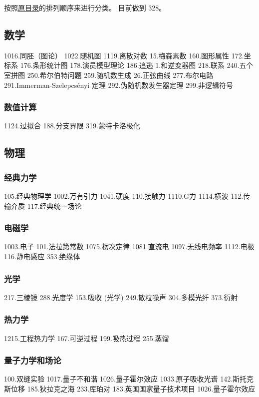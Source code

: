 
\begin{issues}
\issueDraft
\end{issues}

按照\href{https://wuli.wiki/assets/sogou}{原目录}的排列顺序来进行分类。 目前做到 328。

\subsection{数学}
1016.同胚（图论）
1022.随机图
1119.离散对数
15.梅森素数
160.图形属性
172.坐标系
176.条形统计图
178.演员模型理论
186.追逃
1.和逆变器图
218.联系
240.五个室拼图
250.希尔伯特问题
259.随机数生成
26.正弦曲线
277.布尔电路
291.Immerman-Szelepcsényi 定理
292.伪随机数发生器定理
299.非逻辑符号
\subsubsection{数值计算}
1124.过拟合
188.分支界限
319.蒙特卡洛极化

\subsection{物理}
\subsubsection{经典力学}
105.经典物理学
1002.万有引力
1041.硬度
110.接触力
1110.G力
1114.横波
112.传输介质
117.经典统一场论
\subsubsection{电磁学}
1003.电子
101.法拉第常数
1075.楞次定律
1081.直流电
1097.无线电频率
1112.电极
116.静电感应
353.绝缘体
\subsubsection{光学}
217.三棱镜
288.光度学
153.吸收 (光学)
249.散粒噪声
304.多模光纤
373.衍射
\subsubsection{热力学}
1215.工程热力学
167.可逆过程
199.吸热过程
255.蒸馏
\subsubsection{量子力学和场论}
100.双缝实验
1017.量子不和谐
1026.量子霍尔效应
1033.原子吸收光谱
142.斯托克斯位移
185.狄拉克之海
233.库珀对
183.英国国家量子技术项目
1026.量子霍尔效应
